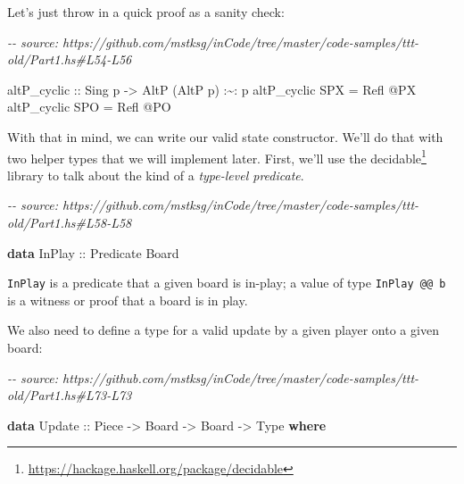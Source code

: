 \documentclass[]{article}
\newenvironment{Shaded}{}{}
\newcommand{\CommentTok}[1]{\textcolor[rgb]{0.38,0.63,0.69}{\textit{#1}}}
\newcommand{\DataTypeTok}[1]{\textcolor[rgb]{0.56,0.13,0.00}{#1}}
\newcommand{\KeywordTok}[1]{\textcolor[rgb]{0.00,0.44,0.13}{\textbf{#1}}}
\newcommand{\NormalTok}[1]{#1}
\newcommand{\OperatorTok}[1]{\textcolor[rgb]{0.40,0.40,0.40}{#1}}
\newcommand{\OtherTok}[1]{\textcolor[rgb]{0.00,0.44,0.13}{#1}}
\renewcommand{\href}[2]{#2\footnote{\url{#1}}}
\begin{document}
Let's just throw in a quick proof as a sanity check:

\begin{Shaded}
\begin{Highlighting}[]
\CommentTok{{-}{-} source: https://github.com/mstksg/inCode/tree/master/code{-}samples/ttt{-}old/Part1.hs\#L54{-}L56}

\OtherTok{altP\_cyclic ::} \DataTypeTok{Sing}\NormalTok{ p }\OtherTok{{-}\textgreater{}} \DataTypeTok{AltP}\NormalTok{ (}\DataTypeTok{AltP}\NormalTok{ p) }\OperatorTok{:\textasciitilde{}:}\NormalTok{ p}
\NormalTok{altP\_cyclic }\DataTypeTok{SPX} \OtherTok{=} \DataTypeTok{Refl} \OperatorTok{@}\DataTypeTok{\textquotesingle{}PX}
\NormalTok{altP\_cyclic }\DataTypeTok{SPO} \OtherTok{=} \DataTypeTok{Refl} \OperatorTok{@}\DataTypeTok{\textquotesingle{}PO}
\end{Highlighting}
\end{Shaded}

With that in mind, we can write our valid state constructor. We'll do that with
two helper types that we will implement later. First, we'll use the
\href{https://hackage.haskell.org/package/decidable}{decidable} library to talk
about the kind of a \emph{type-level predicate}.

\begin{Shaded}
\begin{Highlighting}[]
\CommentTok{{-}{-} source: https://github.com/mstksg/inCode/tree/master/code{-}samples/ttt{-}old/Part1.hs\#L58{-}L58}

\KeywordTok{data} \DataTypeTok{InPlay}\OtherTok{ ::} \DataTypeTok{Predicate} \DataTypeTok{Board}
\end{Highlighting}
\end{Shaded}

\texttt{InPlay} is a predicate that a given board is in-play; a value of type
\texttt{InPlay\ @@\ b} is a witness or proof that a board is in play.

We also need to define a type for a valid update by a given player onto a given
board:

\begin{Shaded}
\begin{Highlighting}[]
\CommentTok{{-}{-} source: https://github.com/mstksg/inCode/tree/master/code{-}samples/ttt{-}old/Part1.hs\#L73{-}L73}

\KeywordTok{data} \DataTypeTok{Update}\OtherTok{ ::} \DataTypeTok{Piece} \OtherTok{{-}\textgreater{}} \DataTypeTok{Board} \OtherTok{{-}\textgreater{}} \DataTypeTok{Board} \OtherTok{{-}\textgreater{}} \DataTypeTok{Type} \KeywordTok{where}
\end{Highlighting}
\end{Shaded}
\end{document}
